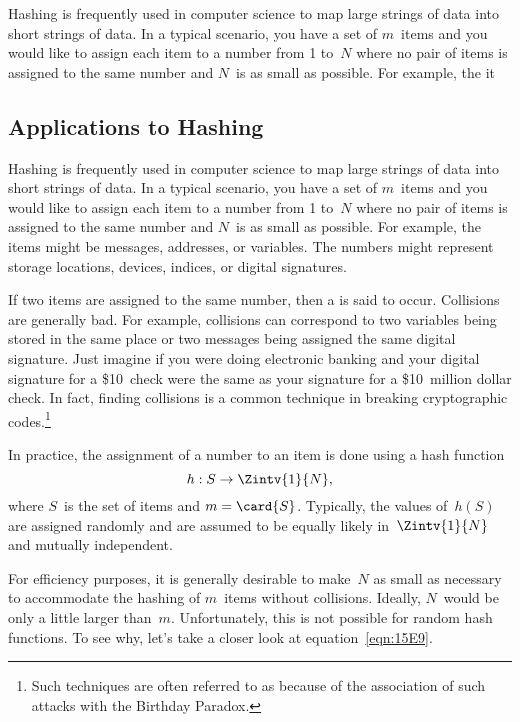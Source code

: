 \begin{editingnotes}
Hashing is frequently used in computer science to map large strings of
data into short strings of data.  In a typical scenario, you have a
set of $m$~items and you would like to assign each item to a number
from 1 to~$N$ where no pair of items is assigned to the same number
and $N$~is as small as possible.  For example, the it

\subsection{Applications to Hashing}

Hashing is frequently used in computer science to map large strings of
data into short strings of data.  In a typical scenario, you have a
set of $m$~items and you would like to assign each item to a number
from 1 to~$N$ where no pair of items is assigned to the same number
and $N$~is as small as possible.  For example, the items might be
messages, addresses, or variables.  The numbers might represent
storage locations, devices, indices, or digital signatures.

If two items are assigned to the same number, then a 
is said to occur.  Collisions are generally bad.  For example,
collisions can correspond to two variables being stored in the same
place or two messages being assigned the same digital signature.  Just
imagine if you were doing electronic banking and your digital
signature for a \$10~check were the same as your signature for a
\$10~million dollar check.  In fact, finding collisions is a common
technique in breaking cryptographic codes.\footnote{Such techniques
  are often referred to as  because of the
  association of such attacks with the Birthday Paradox.}

In practice, the assignment of a number to an item is done using a
hash function
\begin{equation*}
    h: S \to \Zintv{1}{N},
\end{equation*}
where $S$~is the set of items and $m = \card{S}$.  Typically, the
values of~$h(S)$ are assigned randomly and are assumed to be equally
likely in~$\Zintv{1}{N}$ and mutually independent.

For efficiency purposes, it is generally desirable to make~$N$ as
small as necessary to accommodate the hashing of $m$~items without
collisions.  Ideally, $N$~would be only a little larger than~$m$.
Unfortunately, this is not possible for random hash functions.  To see
why, let's take a closer look at equation~\eqref{eqn:15E9}.


\end{editingnotes}
